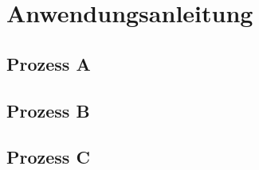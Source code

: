 \section{Anwendungsanleitung}
    \subsection{Prozess A}
    \subsection{Prozess B}
    \subsection{Prozess C}
